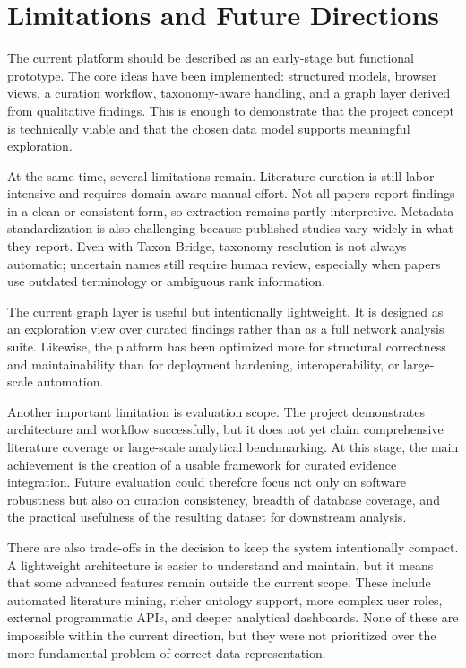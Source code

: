 \section{Limitations and Future Directions}

The current platform should be described as an early-stage but functional prototype. The core ideas have been implemented: structured models, browser views, a curation workflow, taxonomy-aware handling, and a graph layer derived from qualitative findings. This is enough to demonstrate that the project concept is technically viable and that the chosen data model supports meaningful exploration.

At the same time, several limitations remain. Literature curation is still labor-intensive and requires domain-aware manual effort. Not all papers report findings in a clean or consistent form, so extraction remains partly interpretive. Metadata standardization is also challenging because published studies vary widely in what they report. Even with Taxon Bridge, taxonomy resolution is not always automatic; uncertain names still require human review, especially when papers use outdated terminology or ambiguous rank information.

The current graph layer is useful but intentionally lightweight. It is designed as an exploration view over curated findings rather than as a full network analysis suite. Likewise, the platform has been optimized more for structural correctness and maintainability than for deployment hardening, interoperability, or large-scale automation.

Another important limitation is evaluation scope. The project demonstrates architecture and workflow successfully, but it does not yet claim comprehensive literature coverage or large-scale analytical benchmarking. At this stage, the main achievement is the creation of a usable framework for curated evidence integration. Future evaluation could therefore focus not only on software robustness but also on curation consistency, breadth of database coverage, and the practical usefulness of the resulting dataset for downstream analysis.

There are also trade-offs in the decision to keep the system intentionally compact. A lightweight architecture is easier to understand and maintain, but it means that some advanced features remain outside the current scope. These include automated literature mining, richer ontology support, more complex user roles, external programmatic APIs, and deeper analytical dashboards. None of these are impossible within the current direction, but they were not prioritized over the more fundamental problem of correct data representation.

